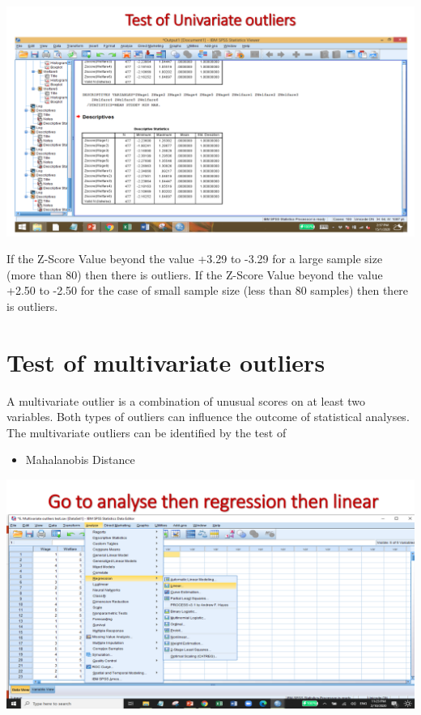 \documentclass[
  letterpaper,
  DIV=11,
  numbers=noendperiod]{scrreprt}
\providecommand{\tightlist}{%
  \setlength{\itemsep}{0pt}\setlength{\parskip}{0pt}}\usepackage{longtable,booktabs,array}
\begin{document}
\includegraphics{images/slides/img_Page_046.png}

\begin{tcolorbox}[enhanced jigsaw, rightrule=.15mm, arc=.35mm, colframe=quarto-callout-note-color-frame, coltitle=black, left=2mm, colbacktitle=quarto-callout-note-color!10!white, bottomtitle=1mm, titlerule=0mm, colback=white, breakable, opacitybacktitle=0.6, opacityback=0, toprule=.15mm, toptitle=1mm, title=\textcolor{quarto-callout-note-color}{\faInfo}\hspace{0.5em}{Univariate outliers criterion}, bottomrule=.15mm, leftrule=.75mm]

If the Z-Score Value beyond the value +3.29 to -3.29 for a large sample
size (more than 80) then there is outliers. If the Z-Score Value beyond
the value +2.50 to -2.50 for the case of small sample size (less than 80
samples) then there is outliers.

\end{tcolorbox}

\section{Test of multivariate
outliers}\label{test-of-multivariate-outliers}

A multivariate outlier is a combination of unusual scores on at least
two variables. Both types of outliers can influence the outcome of
statistical analyses. The multivariate outliers can be identified by the
test of\\

\begin{itemize}
\tightlist
\item
  Mahalanobis Distance
\end{itemize}

\includegraphics{images/slides/img_Page_049.png}
\end{document}

